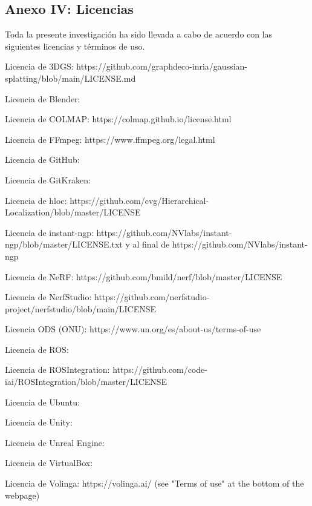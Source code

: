 \documentclass[a4paper, 12pt, spanish, twoside]{article}
\begin{document}

\clearpage




\newpage
\subsection{Anexo IV: Licencias} \label{sec:anexo4}

Toda la presente investigación ha sido llevada a cabo de acuerdo con las siguientes licencias y términos de uso.

Licencia de 3DGS: https://github.com/graphdeco-inria/gaussian-splatting/blob/main/LICENSE.md

Licencia de Blender: 

Licencia de COLMAP: https://colmap.github.io/license.html

Licencia de FFmpeg: https://www.ffmpeg.org/legal.html

Licencia de GitHub: 

Licencia de GitKraken: 

Licencia de hloc: https://github.com/cvg/Hierarchical-Localization/blob/master/LICENSE

Licencia de instant-ngp: https://github.com/NVlabs/instant-ngp/blob/master/LICENSE.txt y al final de https://github.com/NVlabs/instant-ngp

Licencia de NeRF: https://github.com/bmild/nerf/blob/master/LICENSE

Licencia de NerfStudio: https://github.com/nerfstudio-project/nerfstudio/blob/main/LICENSE

Licencia ODS (ONU): https://www.un.org/es/about-us/terms-of-use

Licencia de ROS: 

Licencia de ROSIntegration: https://github.com/code-iai/ROSIntegration/blob/master/LICENSE

Licencia de Ubuntu: 

Licencia de Unity: 

Licencia de Unreal Engine: 

Licencia de VirtualBox: 

Licencia de Volinga: https://volinga.ai/ (see "Terms of use" at the bottom of the webpage)
\end{document}
